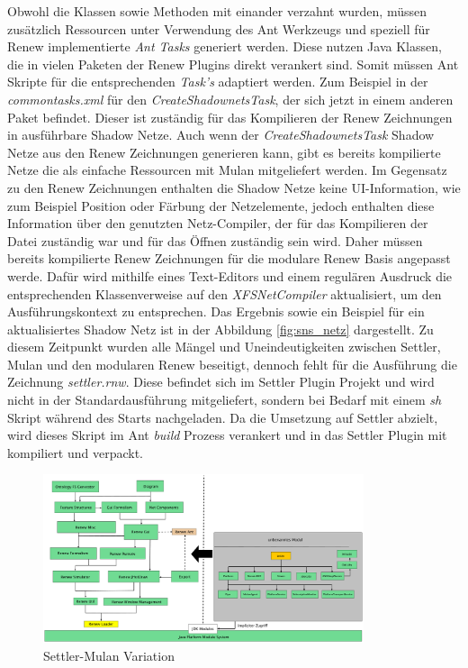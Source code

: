 	Obwohl die Klassen sowie Methoden mit einander verzahnt wurden, müssen zusätzlich Ressourcen unter Verwendung des Ant Werkzeugs und speziell für Renew implementierte \textit{Ant Tasks} generiert werden. Diese nutzen Java Klassen, die in vielen Paketen der Renew Plugins direkt verankert sind. Somit müssen Ant Skripte für die entsprechenden \textit{Task's} adaptiert werden. Zum Beispiel in der \textit{commontasks.xml} für den \textit{CreateShadownetsTask}, der sich jetzt in einem anderen Paket befindet. Dieser ist zuständig für das Kompilieren der Renew Zeichnungen in ausführbare Shadow Netze. Auch wenn der \textit{CreateShadownetsTask} Shadow Netze aus den Renew Zeichnungen generieren kann, gibt es bereits kompilierte Netze die als einfache Ressourcen mit Mulan mitgeliefert werden. \newline
	Im Gegensatz zu den Renew Zeichnungen enthalten die Shadow Netze keine UI-Information, wie zum Beispiel Position oder Färbung der Netzelemente, jedoch enthalten diese Information über den genutzten Netz-Compiler, der für das Kompilieren der Datei zuständig war und für das Öffnen zuständig sein wird. Daher müssen bereits kompilierte Renew Zeichnungen für die modulare Renew Basis angepasst werde. Dafür wird mithilfe eines Text-Editors und einem regulären Ausdruck die entsprechenden Klassenverweise auf den \textit{XFSNetCompiler} aktualisiert, um den Ausführungskontext zu entsprechen. \newline
	Das Ergebnis sowie ein Beispiel für ein aktualisiertes Shadow Netz ist in der Abbildung \ref{fig:sns_netz} dargestellt. \bigbreak
	Zu diesem Zeitpunkt wurden alle Mängel und Uneindeutigkeiten zwischen Settler, Mulan und den modularen Renew beseitigt, dennoch fehlt für die Ausführung die Zeichnung \textit{settler.rnw}. Diese befindet sich im Settler Plugin Projekt und wird nicht in der Standardausführung mitgeliefert, sondern bei Bedarf mit einem \textit{sh} Skript während des Starts nachgeladen. \newline
	Da die Umsetzung auf Settler abzielt, wird dieses Skript im Ant \textit{build} Prozess verankert und in das Settler Plugin mit kompiliert und verpackt. \newline

	\begin{figure}[h!]
	  \centering
	  \includegraphics[width=0.84\textwidth]{material/images/settler-renew-mulan-vm.pdf}
	  \caption{Settler-Mulan Variation}
	  \label{fig:trans_config}
	\end{figure}

